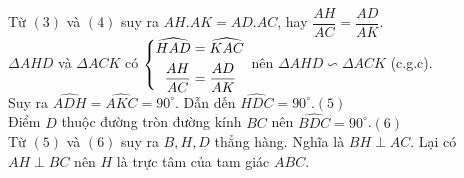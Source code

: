 \begin{bt}
{\begin{enumerate}
Từ $(3)$ và $(4)$ suy ra $AH.AK=AD.AC$, hay $\dfrac{AH}{AC}=\dfrac{AD}{AK}$.\\
$\Delta AHD$ và $\Delta ACK$ có $\left\{\begin{aligned}\widehat{HAD}&=\widehat{KAC}\\ \dfrac{AH}{AC}&=\dfrac{AD}{AK}\end{aligned}\right.$ nên $\Delta AHD\backsim \Delta ACK$ (c.g.c). \\Suy ra $\widehat{ADH}=\widehat{AKC}=90^\circ$. Dẫn dến $\widehat{HDC}=90^\circ$.\hfill $(5)$\\
Điểm $D$ thuộc đường tròn đường kính $BC$ nên $\widehat{BDC}=90^\circ$.\hfill $(6)$\\
Từ $(5)$ và $(6)$ suy ra $B,H,D$ thẳng hàng. Nghĩa là $BH\perp AC$.
Lại có $AH\perp BC$ nên $H$ là trực tâm của tam giác $ABC$.
\end{enumerate}
}
\end{bt}


